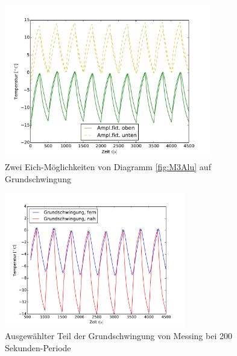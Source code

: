 \begin{figure}[h]
	\label{fig:M3MessingNorm}
	\centering
	\includegraphics[width=0.8\textwidth]{Bilder/Normierungsauswahl/M3_Alu_norm.pdf}
	\caption{ Zwei Eich-Möglichkeiten von Diagramm \ref{fig:M3Alu} auf Grundschwingung}
\end{figure}
\begin{figure}[h]
	\label{fig:M3MessingNormkurve}
	\centering
	\includegraphics[width=0.7\textwidth]{Bilder/M3_Messing_norm.pdf}
	\caption{Ausgewählter Teil der Grundschwingung von Messing bei 200 Sekunden-Periode}
\end{figure}
